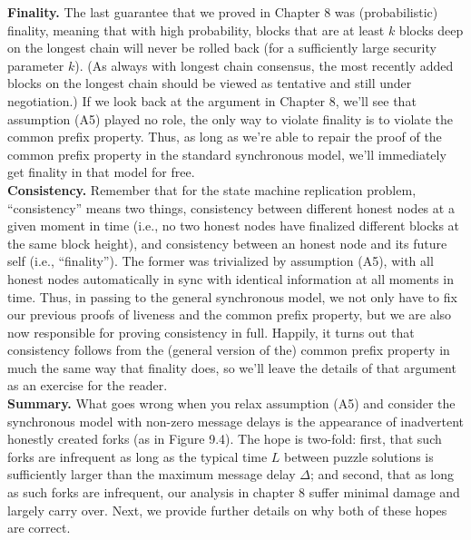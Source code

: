 \noindent
\textbf{Finality.} The last guarantee that we proved in Chapter 8 was (probabilistic) finality, meaning that with high probability, blocks that are at least $k$ blocks deep on the longest chain will
never be rolled back (for a sufficiently large security parameter $k$). (As always with longest chain consensus, the most recently added blocks on the longest chain should be viewed as
tentative and still under negotiation.) If we look back at the argument in Chapter 8, we’ll
see that assumption (A5) played no role, the only way to violate finality is to violate the
common prefix property. Thus, as long as we’re able to repair the proof of the common
prefix property in the standard synchronous model, we’ll immediately get finality in that
model for free.\\

\noindent
\textbf{Consistency.} Remember that for the state machine replication problem, “consistency”
means two things, consistency between different honest nodes at a given moment in time
(i.e., no two honest nodes have finalized different blocks at the same block height), and
consistency between an honest node and its future self (i.e., “finality”). The former was
trivialized by assumption (A5), with all honest nodes automatically in sync with identical
information at all moments in time. Thus, in passing to the general synchronous model, we
not only have to fix our previous proofs of liveness and the common prefix property, but we are
also now responsible for proving consistency in full. Happily, it turns out that consistency
follows from the (general version of the) common prefix property in much the same way that
finality does, so we’ll leave the details of that argument as an exercise for the reader.\\

\noindent
\textbf{Summary.} What goes wrong when you relax assumption (A5) and consider the synchronous model with non-zero message delays is the appearance of inadvertent honestly created forks (as in Figure 9.4). The hope is two-fold: first, that such forks are infrequent
as long as the typical time $L$ between puzzle solutions is sufficiently larger than the maximum message delay $\Delta$; and second, that as long as such forks are infrequent, our analysis in
chapter 8 suffer minimal damage and largely carry over. Next, we provide further details on
why both of these hopes are correct.

